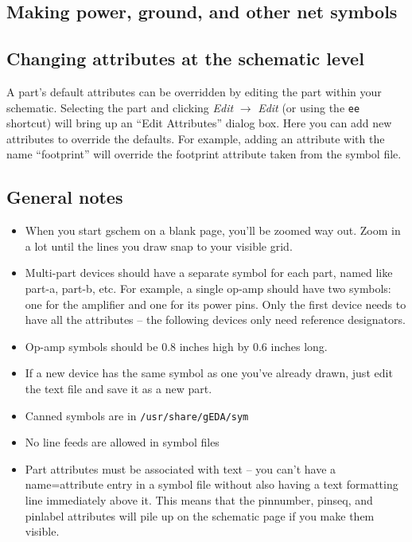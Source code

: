 


\clearpage
\subsection{Making power, ground, and other net symbols}


\clearpage
\subsection{Changing attributes at the schematic level}
A part's default attributes can be overridden by editing the part within your schematic.  Selecting the part and clicking \textsl{Edit} $\rightarrow$ \textsl{Edit} (or using the \texttt{ee} shortcut) will bring up an ``Edit Attributes'' dialog box.  Here you can add new attributes to override the defaults.  For example, adding an attribute with the name ``footprint'' will override the footprint attribute taken from the symbol file.

\subsection{General notes}
\begin{itemize}
    \item When you start gschem on a blank page, you'll be zoomed way out.  Zoom in a lot until the lines you draw snap to your visible grid.
    \item Multi-part devices should have a separate symbol for each part, named like part-a, part-b, etc.  For example, a single op-amp should have two symbols: one for the amplifier and one for its power pins.  Only the first device needs to have all the attributes -- the following devices only need reference designators.
    \item Op-amp symbols should be 0.8 inches high by 0.6 inches long.
    \item If a new device has the same symbol as one you've already drawn, just edit the text file and save it as a new part.
    \item Canned symbols are in \texttt{/usr/share/gEDA/sym}
    \item No line feeds are allowed in symbol files
    \item Part attributes must be associated with text -- you can't have a name=attribute entry in a symbol file without also having a text formatting line immediately above it.  This means that the pinnumber, pinseq, and pinlabel attributes will pile up on the schematic page if you make them visible.
\end{itemize}



